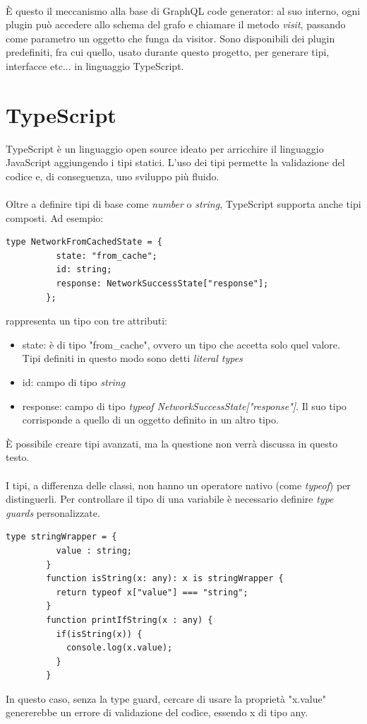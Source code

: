 \documentclass[a4paper, 12pt]{report}
\begin{document}
      \paragraph*{}È questo il meccanismo alla base di GraphQL code generator: al suo interno, ogni plugin può accedere allo schema del grafo e chiamare il metodo \emph{visit}, passando come parametro un oggetto che funga da visitor.
        Sono disponibili dei plugin predefiniti, fra cui quello, usato durante questo progetto, per generare tipi, interfacce etc... in linguaggio TypeScript.
    \section{TypeScript}
      TypeScript è un linguaggio open source ideato per arricchire il linguaggio JavaScript aggiungendo i tipi statici.
      L'uso dei tipi permette la validazione del codice e, di conseguenza, uno sviluppo più fluido.
      \paragraph*{}
      Oltre a definire tipi di base come \emph{number} o \emph{string}, TypeScript supporta anche tipi composti. Ad esempio:
      \begin{Verbatim}[samepage=true]
        type NetworkFromCachedState = {
          state: "from_cache";
          id: string;
          response: NetworkSuccessState["response"];
        };
      \end{Verbatim}
      rappresenta un tipo con tre attributi:
      \begin{itemize}
        \item state: è di tipo "from_cache", ovvero un tipo che accetta solo quel valore. Tipi definiti in questo modo sono detti \emph{literal types}
        \item id: campo di tipo \emph{string}
        \item response: campo di tipo \emph{typeof NetworkSuccessState["response"]}. Il suo tipo corrisponde a quello di un oggetto definito in un altro tipo.
      \end{itemize}
      È possibile creare tipi avanzati, ma la questione non verrà discussa in questo testo.
      \paragraph*{}
      I tipi, a differenza delle classi, non hanno un operatore nativo (come \emph{typeof}) per distinguerli.
      Per controllare il tipo di una variabile è necessario definire \emph{type guards} personalizzate.
      \begin{Verbatim}[samepage=true]
        type stringWrapper = {
          value : string;
        }
        function isString(x: any): x is stringWrapper {
          return typeof x["value"] === "string";
        }
        function printIfString(x : any) {
          if(isString(x)) {
            console.log(x.value);
          }
        }
      \end{Verbatim}
      In questo caso, senza la type guard, cercare di usare la proprietà "x.value" genererebbe un errore di validazione del codice, essendo x di tipo any.
\end{document}

